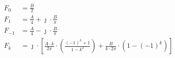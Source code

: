 \begin{task}

\begin{align*}
F_0&=\frac{B}{2}\\
F_1&=\frac{A}{4} + \jmath \cdot \frac{B}{\pi}\\
F_{-1}&=\frac{A}{4} - \jmath \cdot \frac{B}{\pi}\\
F_k&= \jmath \cdot \left[\frac{A \cdot k}{2\pi} \cdot \left( \frac{ (-1)^{k}  + 1}{1 -k^2} \right) + \frac{B}{k\cdot 2 \pi}\cdot \left( 1 - (-1)^{k}\right)\right]
\end{align*}

\end{task}
